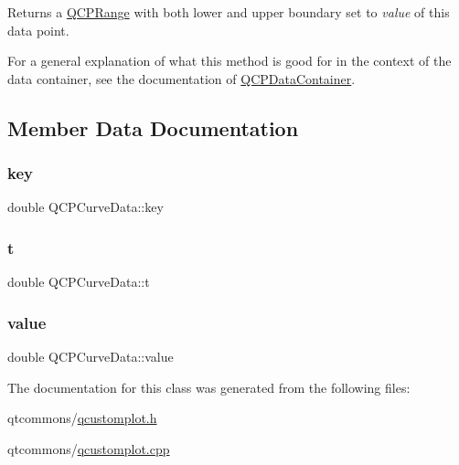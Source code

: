 Returns a \mbox{\hyperlink{class_q_c_p_range}{Q\+C\+P\+Range}} with both lower and upper boundary set to {\itshape value} of this data point.

For a general explanation of what this method is good for in the context of the data container, see the documentation of \mbox{\hyperlink{class_q_c_p_data_container}{Q\+C\+P\+Data\+Container}}. 

\subsection{Member Data Documentation}
\mbox{\label{class_q_c_p_curve_data_a8a4ec5f2b9a396149fd842e309701bd4}} 
\subsubsection{\texorpdfstring{key}{key}}
{\footnotesize\ttfamily double Q\+C\+P\+Curve\+Data\+::key}

\mbox{\label{class_q_c_p_curve_data_aecc395525be28e9178a088793beb3ff3}} 
\subsubsection{\texorpdfstring{t}{t}}
{\footnotesize\ttfamily double Q\+C\+P\+Curve\+Data\+::t}

\mbox{\label{class_q_c_p_curve_data_a72b39b8e1dbf7b45382ebd48419b6828}} 
\subsubsection{\texorpdfstring{value}{value}}
{\footnotesize\ttfamily double Q\+C\+P\+Curve\+Data\+::value}



The documentation for this class was generated from the following files\+:\begin{DoxyCompactItemize}
\item 
qtcommons/\mbox{\hyperlink{qcustomplot_8h}{qcustomplot.\+h}}\item 
qtcommons/\mbox{\hyperlink{qcustomplot_8cpp}{qcustomplot.\+cpp}}\end{DoxyCompactItemize}
